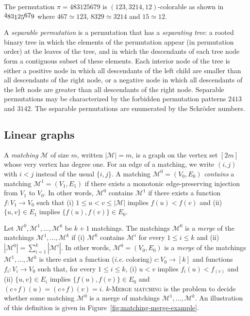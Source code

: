 \begin{example}
The permutation $\pi = 483125679$ is $(123, 3214, 12)$-colorable
as shown in
$
\raisebox{1.5pt}{$4$}
\raisebox{0pt}{$8$}
\raisebox{0pt}{$3$}
\raisebox{-1.5pt}{$1$}
\raisebox{0pt}{$2$}
\raisebox{-1.5pt}{$5$}
\raisebox{1.5pt}{$6$}
\raisebox{1.5pt}{$7$}
\raisebox{0pt}{$9$}
$
where
$467 \simeq 123$,
$8329 \simeq 3214$ and
$15 \simeq 12$.
\end{example}

A \emph{separable permutation} is a permutation that has a \emph{separating tree}:
a rooted binary tree in which the elements
of the permutation appear (in permutation order) at the leaves of the tree,
and in which the descendants of each tree node form a contiguous subset of
these elements.
Each interior node of the tree is either a positive node in which all
descendants of the left child are smaller than all descendants of the right node,
or a negative node in which all descendants of the left node are greater than all
descendants of the right node.
Separable permutations may be characterized by the forbidden permutation
patterns $2413$ and $3142$.
The separable permutations are enumerated by the Schröder numbers.

\subsection*{\textbf{Linear graphs}}

A \emph{matching} $\mathcal{M}$ of size $m$, written $|\mathcal{M}| = m$, 
is a graph on the vertex set $[2m]$ whose very vertex has degree one.
For an edge of a matching, we write $(i, j)$ with $i < j$ instead of the usual $\{i, j\}$.
A matching $\mathcal{M}^0 = (V_0, E_0)$ \emph{contains} a matching 
$\mathcal{M}^1 = (V_1, E_1)$ if there exists a monotonic edge-preserving injection from $V_1$ to $V_0$.
In other words, $\mathcal{M}^0$ contains $\mathcal{M}^1$ if there exists a function 
$f : V_1 \to V_0$ such that 
(i) $1 \leq u < v \leq |\mathcal{M}|$ implies $f(u) < f(v)$ and  
(ii) $\{u, v\} \in E_1$ implies $\{f(u), f(v)\} \in E_0$.

Let $\mathcal{M}^0, \mathcal{M}^1, \dots, \mathcal{M}^k$ be $k+1$ matchings.
The matchings $\mathcal{M}^0$ is a \emph{merge} of the matchings 
$\mathcal{M}^1, \dots, \mathcal{M}^k$ 
if 
(i) $\mathcal{M}^0$ contains $\mathcal{M}^i$ for every $1 \leq i \leq k$ 
and (ii) $\left|\mathcal{M}^0\right| = \sum_{i=1}^{k} \left|\mathcal{M}^i\right|$.
In other words,  $\mathcal{M}^0 = (V_0, E_0)$ is a \emph{merge} of the matchings 
$\mathcal{M}^1, \dots, \mathcal{M}^k$ is there exist a function (\emph{i.e.} coloring)
$c : V_0 \to [k]$  and functions $f_i : V_i \to V_0$ such that, for every $1 \leq i \leq k$,
(i) $u < v$ implies $f_i(u) < f_(v)$ and  
(ii) $\{u, v\} \in E_i$ implies $\{f(u), f(v)\} \in E_0$ and $(c \circ f)(u) = (c \circ f)(v) = i$.
\textsc{$k$-Merge matching} is the problem to decide whether some matching 
$\mathcal{M}^0$ is a merge of matchings $\mathcal{M}^1, \dots, \mathcal{M}^k$.
An illustration of this definition is given in Figure~\ref{fig:matching-merge-example}.


